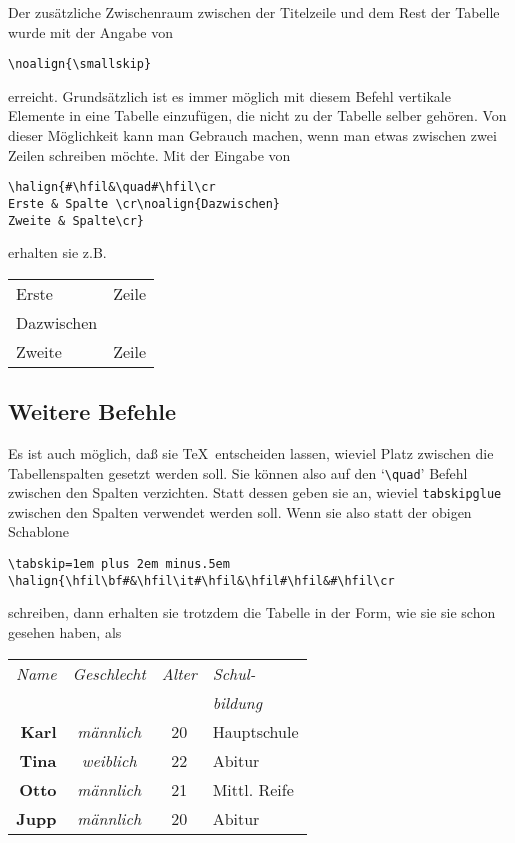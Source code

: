 Der zus\"atzliche 
Zwischenraum zwischen der Titelzeile und dem Rest der
Tabelle wurde mit der Angabe von
\begin{verbatim}
\noalign{\smallskip}
\end{verbatim}
erreicht. Grunds\"atzlich ist es immer m\"oglich mit diesem Befehl
vertikale Elemente in eine Tabelle einzuf\"ugen, die nicht zu der
Tabelle selber geh\"oren. Von dieser M\"oglichkeit kann man Gebrauch
machen, wenn man etwas zwischen zwei Zeilen schreiben m\"ochte. Mit der
Eingabe von
\begin{verbatim}
\halign{#\hfil&\quad#\hfil\cr
Erste & Spalte \cr\noalign{Dazwischen}
Zweite & Spalte\cr}
\end{verbatim}
erhalten sie z.B.

\medskip\begin{tabular}{ll}
\qquad Erste & Zeile \\
Dazwischen\\
\qquad Zweite & Zeile
\end{tabular}\medskip

\subsection{Weitere Befehle}
Es ist auch m\"oglich, da\ss{} sie \TeX\ entscheiden lassen, wieviel Platz
zwischen die 
Tabellenspalten gesetzt werden soll. Sie k\"onnen also auf
den 
`\verb|\quad|' Befehl zwischen den Spalten verzichten. Statt
dessen geben sie an, wieviel {\tt tabskipglue} zwischen den Spalten
verwendet werden soll. Wenn sie also statt der obigen
Schablone
\begin{verbatim}
\tabskip=1em plus 2em minus.5em
\halign{\hfil\bf#&\hfil\it#\hfil&\hfil#\hfil&#\hfil\cr
\end{verbatim}
schreiben, dann erhalten sie trotzdem die Tabelle in der Form, wie sie
sie schon gesehen haben, als

\medskip\begin{tabular}{rccl}
{\em Name} & {\em Geschlecht} & {\em Alter} & {\em Schul-} \\[2pt]
 & & & {\em bildung} \\[1ex]
\bf Karl & \em m\"annlich & 20 & Hauptschule\\[2pt]
\bf Tina & \em weiblich & 22 & Abitur\\[2pt]
\bf Otto & \em m\"annlich & 21 & Mittl. Reife\\[2pt]
\bf Jupp & \em m\"annlich & 20 & Abitur
\end{tabular}\medskip


